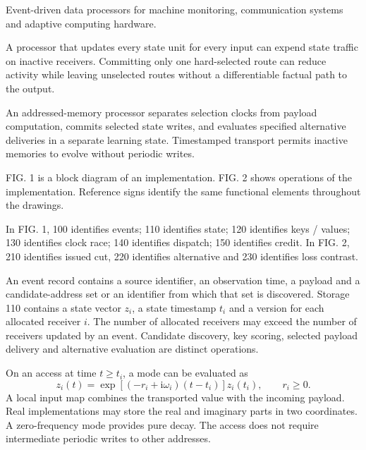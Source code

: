 \documentclass[pct]{sm-patent}
\begin{document}
\descriptionstart


\pnum Event-driven data processors for machine monitoring, communication systems and adaptive computing hardware.


\pnum A processor that updates every state unit for every input can expend state traffic on inactive receivers. Committing only one hard-selected route can reduce activity while leaving unselected routes without a differentiable factual path to the output.


\pnum An addressed-memory processor separates selection clocks from payload computation, commits selected state writes, and evaluates specified alternative deliveries in a separate learning state. Timestamped transport permits inactive memories to evolve without periodic writes.


\pnum FIG. 1 is a block diagram of an implementation. FIG. 2 shows operations of the implementation. Reference signs identify the same functional elements throughout the drawings.


\pnum In FIG. 1, 100 identifies events; 110 identifies state; 120 identifies keys / values; 130 identifies clock race; 140 identifies dispatch; 150 identifies credit. In FIG. 2, 210 identifies issued cut, 220 identifies alternative and 230 identifies loss contrast.

\pnum An event record contains a source identifier, an observation time, a payload and a candidate-address set or an identifier from which that set is discovered. Storage 110 contains a state vector $z_i$, a state timestamp $t_i$ and a version for each allocated receiver $i$. The number of allocated receivers may exceed the number of receivers updated by an event. Candidate discovery, key scoring, selected payload delivery and alternative evaluation are distinct operations.

\pnum On an access at time $t\geq t_i$, a mode can be evaluated as
\[z_i(t)=\exp\!\left[(-r_i+\mathrm{i}\omega_i)(t-t_i)\right]z_i(t_i),\qquad r_i\geq0.
\]
A local input map combines the transported value with the incoming payload. Real implementations may store the real and imaginary parts in two coordinates. A zero-frequency mode provides pure decay. The access does not require intermediate periodic writes to other addresses.
\end{document}
